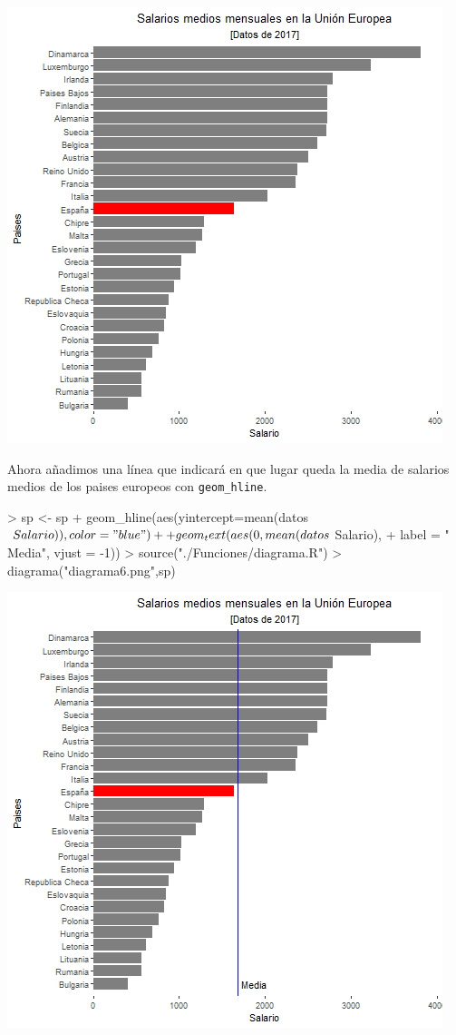 \documentclass [a4paper] {article}
\begin{document}
\includegraphics[width=\textwidth]{diagrama5}

\bigskip
Ahora añadimos una línea que indicará en que lugar queda la media de salarios medios de los paises europeos con
\texttt{geom\_hline}.
\begin{Schunk}
\begin{Sinput}
> sp <- sp + geom_hline(aes(yintercept=mean(datos$Salario)),color = "blue") + 
+         geom_text(aes(0,mean(datos$Salario),
+         label = "            Media", vjust = -1))
> source("./Funciones/diagrama.R")
> diagrama("diagrama6.png",sp)
\end{Sinput}
\end{Schunk}

\includegraphics[width=\textwidth]{diagrama6}
\end{document}
